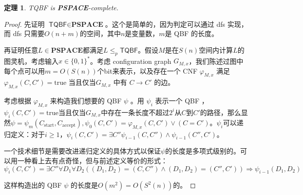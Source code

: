 \documentclass[8pt]{article}
\theoremstyle{compact}
\newtheorem{theorem}{定理}
\def\le{\leqslant}
\def\ge{\geqslant}
\def\PSPACE{\textbf{PSPACE}}
\begin{document}
\begin{theorem}
	\textsf{TQBF} is \PSPACE-complete.
\end{theorem}
\begin{proof}
	先证明 $\textsf{TQBF} \in \PSPACE$。这个是简单的，因为判定可以通过 dfs 实现，而 dfs 只需要$O(n + m)$的空间，其中$n$是变量数，$m$是 QBF 的长度。

	再证明任意$L \in \PSPACE$都满足$L \le_p \textsf{TQBF}$。假设$M$是在$S(n)$空间内计算$L$的图灵机，考虑输入$x \in \{0, 1\}^*$。考虑 configuration graph $G_{M, x}$，我们陈述过图中每个点可以用$m = O(S(n))$个bit来表示，以及存在一个 CNF $\varphi_{M, x}$ 满足$\varphi_{M, x}(C, C') = \textrm{true}$ 当且仅当$G_{M, x}$ 中有 $C \to C'$ 的边。

	考虑根据 $\varphi_{M, x}$ 来构造我们想要的 QBF $\psi$ 。用 $\psi_i$ 表示一个 QBF ，$\psi_i(C, C') = \textrm{true}$当且仅当$G_{M, x}$中存在一条长度不超过$2^i$从$C$到$C'$的路径，那么显然$\psi = \psi_m(C_{\text{start}}, C_{\text{accept}}), \psi_0(C, C') = \varphi_{M, x}(C, C') \vee (C = C')$。$\psi_i$可以递归定义：对于$i \ge 1$，$\psi_i(C, C') = \exists C'' \psi_{i-1}(C, C'') \wedge \psi_{i-1}(C'', C')$。

	一个技术细节是需要改进递归定义的具体方式以保证$\psi$的长度是多项式级别的。可以用一种看上去有点奇怪，但与前述定义等价的形式：
	$$\psi_i(C, C') = \exists C''\forall D_1 \forall D_2 ((D_1, D_2) = (C, C'') \wedge (D_1, D_2) = (C'', C')) \Rightarrow \psi_{i-1}(D_1, D_2)$$

	这样构造出的 QBF $\psi$ 的长度是$O(m^2) = O(S^2(n))$的。
\end{proof}
\end{document}
